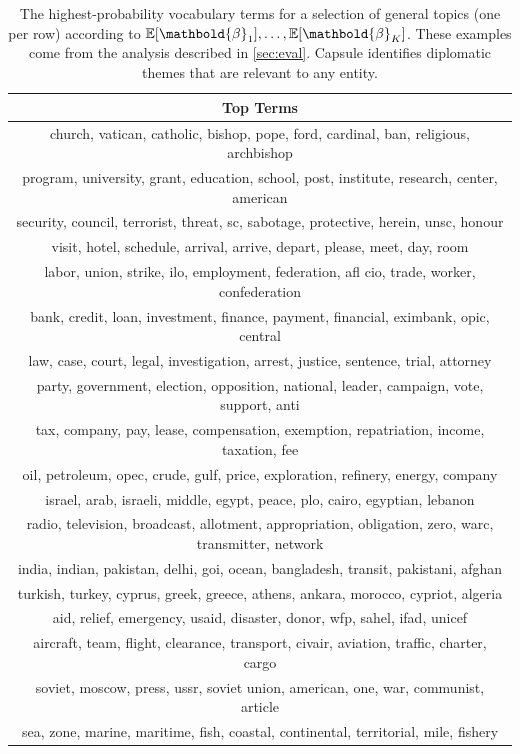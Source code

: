 \begin{table}[htb]
\centering
\small
\begin{tabular}{c}
\toprule
\textbf{Top Terms} \\
\midrule
church, vatican, catholic, bishop, pope, ford, cardinal, ban, religious, archbishop \\
program, university, grant, education, school, post, institute, research, center, american \\
security, council, terrorist, threat, sc, sabotage, protective, herein, unsc, honour \\
visit, hotel, schedule, arrival, arrive, depart, please, meet, day, room \\
labor, union, strike, ilo, employment, federation, afl cio, trade, worker, confederation \\
bank, credit, loan, investment, finance, payment, financial, eximbank, opic, central \\
law, case, court, legal, investigation, arrest, justice, sentence, trial, attorney \\
party, government, election, opposition, national, leader, campaign, vote, support, anti \\
tax, company, pay, lease, compensation, exemption, repatriation, income, taxation, fee \\
oil, petroleum, opec, crude, gulf, price, exploration, refinery, energy, company \\
israel, arab, israeli, middle, egypt, peace, plo, cairo, egyptian, lebanon \\
radio, television, broadcast, allotment, appropriation, obligation, zero, warc, transmitter, network \\
india, indian, pakistan, delhi, goi, ocean, bangladesh, transit, pakistani, afghan \\
turkish, turkey, cyprus, greek, greece, athens, ankara, morocco, cypriot, algeria \\
aid, relief, emergency, usaid, disaster, donor, wfp, sahel, ifad, unicef \\
aircraft, team, flight, clearance, transport, civair, aviation, traffic, charter, cargo \\
soviet, moscow, press, ussr, soviet union, american, one, war, communist, article \\
sea, zone, marine, maritime, fish, coastal, continental, territorial, mile, fishery \\
\bottomrule
\end{tabular}
\caption{The highest-probability vocabulary terms
for a selection of
general topics (one per row) according to
$\E[\mathbold{\beta}_1], \ldots, \E[\mathbold{\beta}_K]$. These
examples come from the analysis described in \cref{sec:eval}. Capsule identifies diplomatic
themes that are relevant to any entity.}
\label{tab:topics}
\end{table}

